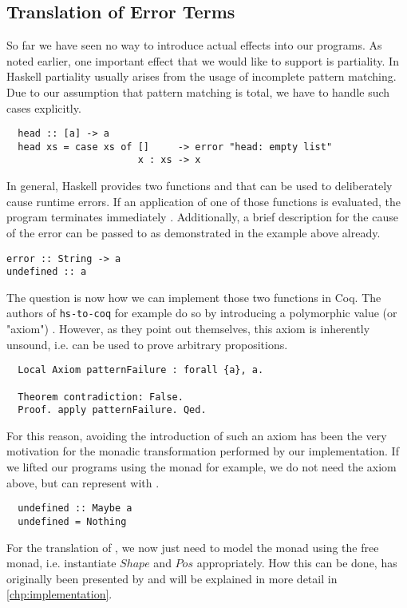 \subsection{Translation of Error Terms} \label{sec:translation:expr:errors}
So far we have seen no way to introduce actual effects into our programs.
As noted earlier, one important effect that we would like to support is partiality.
In Haskell partiality usually arises from the usage of incomplete pattern matching.
Due to our assumption that pattern matching is total, we have to handle such cases explicitly.
\begin{verbatim}
  head :: [a] -> a
  head xs = case xs of []     -> error "head: empty list"
                       x : xs -> x
\end{verbatim}
In general, Haskell provides two functions  and  that can be used to deliberately cause runtime errors.
If an application of one of those functions is evaluated, the program terminates immediately \cite[p.~16]{Marlow:2010}.
Additionally, a brief description for the cause of the error can be passed to  as demonstrated in the example above already.
\begin{verbatim}
error :: String -> a
undefined :: a
\end{verbatim}

The question is now how we can implement those two functions in Coq.
The authors of \texttt{hs-to-coq} for example do so by introducing a polymorphic value (or "axiom")  \cite[p.~10]{SpectorZabusky:2017}.
However, as they point out themselves, this axiom is inherently unsound, i.e. can be used to prove arbitrary propositions.
\begin{verbatim}
  Local Axiom patternFailure : forall {a}, a.

  Theorem contradiction: False.
  Proof. apply patternFailure. Qed.
\end{verbatim}

For this reason, avoiding the introduction of such an axiom has been the very motivation for the monadic transformation performed by our implementation.
If we lifted our programs using the  monad for example, we do not need the axiom above, but can represent  with .
\begin{verbatim}
  undefined :: Maybe a
  undefined = Nothing
\end{verbatim}
For the translation of , we now just need to model the  monad using the free monad, i.e. instantiate $Shape$ and $Pos$ appropriately.
How this can be done, has originally been presented by \cite{Dylus:2018} and will be explained in more detail in \autoref{chp:implementation}. %

